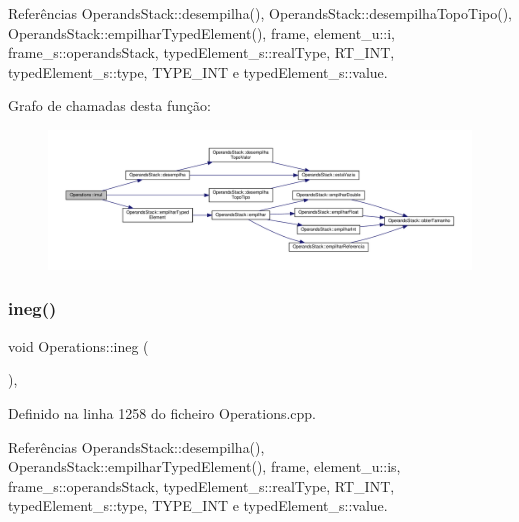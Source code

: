 Referências Operands\+Stack\+::desempilha(), Operands\+Stack\+::desempilha\+Topo\+Tipo(), Operands\+Stack\+::empilhar\+Typed\+Element(), frame, element\+\_\+u\+::i, frame\+\_\+s\+::operands\+Stack, typed\+Element\+\_\+s\+::real\+Type, R\+T\+\_\+\+I\+NT, typed\+Element\+\_\+s\+::type, T\+Y\+P\+E\+\_\+\+I\+NT e typed\+Element\+\_\+s\+::value.

Grafo de chamadas desta função\+:\nopagebreak
\begin{figure}[H]
\begin{center}
\leavevmode
\includegraphics[width=350pt]{classOperations_a01b2ffdd380327b31b03657eb99b8a81_cgraph}
\end{center}
\end{figure}
\mbox{\label{classOperations_a819d5dd66c64a6801a1599b5abf81ae7}} 
\subsubsection{\texorpdfstring{ineg()}{ineg()}}
{\footnotesize\ttfamily void Operations\+::ineg (\begin{DoxyParamCaption}{ }\end{DoxyParamCaption})\hspace{0.3cm}{\ttfamily [static]}, {\ttfamily [private]}}



Definido na linha 1258 do ficheiro Operations.\+cpp.



Referências Operands\+Stack\+::desempilha(), Operands\+Stack\+::empilhar\+Typed\+Element(), frame, element\+\_\+u\+::is, frame\+\_\+s\+::operands\+Stack, typed\+Element\+\_\+s\+::real\+Type, R\+T\+\_\+\+I\+NT, typed\+Element\+\_\+s\+::type, T\+Y\+P\+E\+\_\+\+I\+NT e typed\+Element\+\_\+s\+::value.

